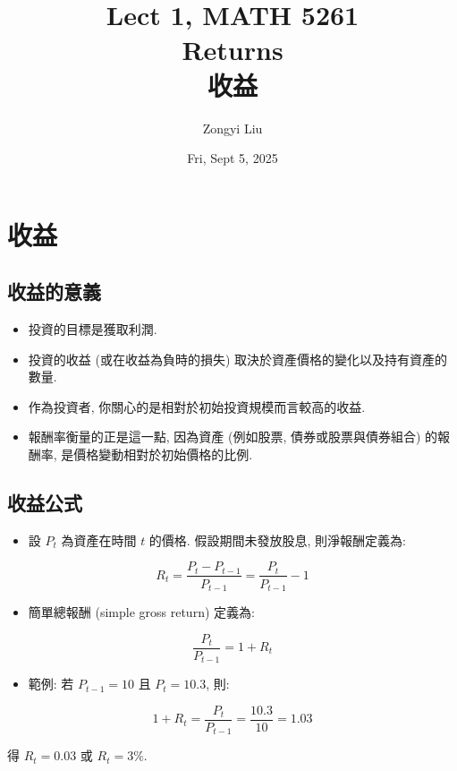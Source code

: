 \documentclass[letterpaper]{article}
\title{Lect 1, MATH 5261 \\
		\small{Returns\\
			收益
		}
	}
\author{Zongyi Liu}
\date{Fri, Sept 5, 2025}
\begin{document}
		\maketitle
		
		\tableofcontents
		
		\section{收益}
		\subsection{收益的意義}
		\begin{itemize}
			\item 投資的目標是獲取利潤. 
			\item 投資的收益 (或在收益為負時的損失) 取決於資產價格的變化以及持有資產的數量. 
			\item 作為投資者, 你關心的是相對於初始投資規模而言較高的收益. 
			\item 報酬率衡量的正是這一點, 因為資產 (例如股票, 債券或股票與債券組合) 的報酬率, 是價格變動相對於初始價格的比例. 
		\end{itemize}
		
		
		\subsection{收益公式}
		\begin{itemize}
			\item 設 $P_{t}$ 為資產在時間 $t$ 的價格. 假設期間未發放股息, 則淨報酬定義為: 
		\end{itemize}
		
		$$
		R_{t}=\frac{P_{t}-P_{t-1}}{P_{t-1}}=\frac{P_{t}}{P_{t-1}}-1
		$$
		
		\begin{itemize}
			\item 簡單總報酬 (simple gross return) 定義為: 
		\end{itemize}
		
		$$
		\frac{P_{t}}{P_{t-1}}=1+R_{t}
		$$
		
		\begin{itemize}
			\item 範例: 若 $P_{t-1}=10$ 且 $P_{t}=10.3$, 則: 
		\end{itemize}
		
		$$
		1+R_{t}=\frac{P_{t}}{P_{t-1}}=\frac{10.3}{10}=1.03
		$$
		
		得 $R_{t}=0.03$ 或 $R_{t}=3 \%$.
		
\end{document}
